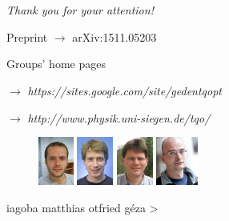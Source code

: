 \documentclass{beamer}
\begin{document}
\section*{}
	\begin{frame}
		\emph{\LARGE Thank you for your attention!}

		\vspace{15px}
		Preprint $\rightarrow$ arXiv:1511.05203

		\vspace{10px}
		Groups' home pages

		\hspace{15px} $\rightarrow$ \emph{\color{blue} https://sites.google.com/site/gedentqopt}

		\hspace{15px} $\rightarrow$ \emph{\color{blue} http://www.physik.uni-siegen.de/tqo/}
		\vspace{10px}

		\begin{figure}
			\includegraphics[height=60px]{img/authors/iagoba.jpg}
			\hspace{10px}
			\includegraphics[height=60px]{img/authors/matthias.jpg}
			\hspace{10px}
			\includegraphics[height=60px]{img/authors/otfried.jpg}
			\hspace{10px}
			\includegraphics[height=60px]{img/authors/geza.jpg}
		\end{figure}
		\vspace{-25px}

		\begin{center}
			iagoba \hspace{16px}
			matthias \hspace{16px}
			otfried \hspace{30px}
			g\'eza {\color{white}>}
		\end{center}
	\end{frame}
\end{document}
